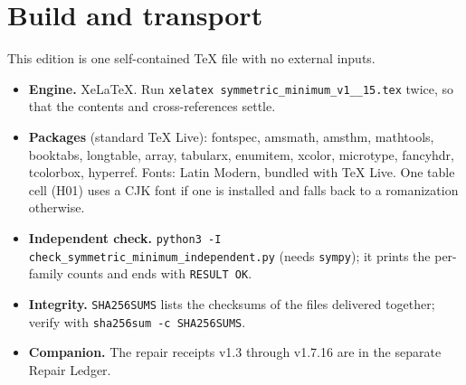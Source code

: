 \documentclass[11pt,a4paper]{article}
\theoremstyle{plain}
\theoremstyle{definition}
\theoremstyle{remark}
\begin{document}
\section{Build and transport}\label{app:F}
This edition is one self-contained \TeX{} file with no external inputs.
\begin{itemize}[leftmargin=1.4em]
\item \textbf{Engine.} XeLaTeX. Run \texttt{xelatex symmetric\_\allowbreak minimum\_\allowbreak v1\_\_\allowbreak 15.tex} twice, so that the contents and cross-references settle.
\item \textbf{Packages} (standard TeX Live): fontspec, amsmath, amsthm, mathtools, booktabs, longtable, array, tabularx, enumitem, xcolor, microtype, fancyhdr, tcolorbox, hyperref. Fonts: Latin Modern, bundled with TeX Live. One table cell (H01) uses a CJK font if one is installed and falls back to a romanization otherwise.
\item \textbf{Independent check.} \texttt{python3 -I check\_\allowbreak symmetric\_\allowbreak minimum\_\allowbreak independent.py} (needs \texttt{sympy}); it prints the per-family counts and ends with \texttt{RESULT OK}.
\item \textbf{Integrity.} \texttt{SHA256SUMS} lists the checksums of the files delivered together; verify with \texttt{sha256sum -c SHA256SUMS}.
\item \textbf{Companion.} The repair receipts v1.3 through v1.7.16 are in the separate Repair Ledger.
\end{itemize}
\end{document}
